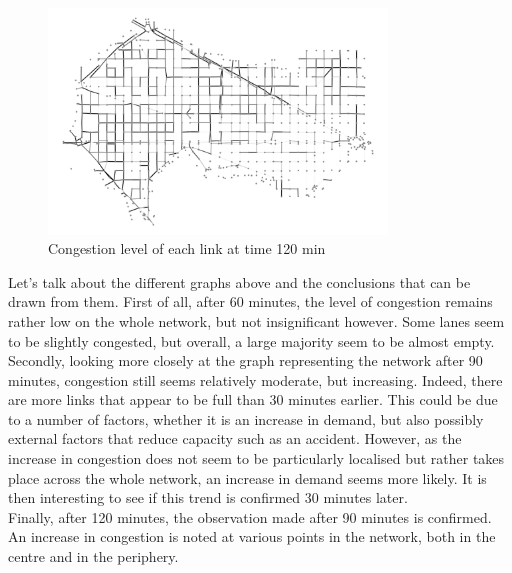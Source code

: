 \documentclass[a4paper, 12pt,oneside]{article}
\begin{document}
\begin{figure}[H]
    \begin{center}
        \includegraphics[width=9cm]{Images/Graph_gray_120min.png}
        \caption{Congestion level of each link at time 120 min}
        \label{Congestion level of each link at time 120 min}
    \end{center}
\end{figure}

\bigbreak
\newpage
Let's talk about the different graphs above and the conclusions that can be drawn from them. 
First of all, after 60 minutes, the level of congestion remains rather low on the whole network, but not insignificant however. Some lanes seem to be slightly congested, but overall, a large majority seem to be almost empty.\\
Secondly, looking more closely at the graph representing the network after 90 minutes, congestion still seems relatively moderate, but increasing. Indeed, there are more links that appear to be full than 30 minutes earlier. This could be due to a number of factors, whether it is an increase in demand, but also possibly external factors that reduce capacity such as an accident. However, as the increase in congestion does not seem to be particularly localised but rather takes place across the whole network, an increase in demand seems more likely. It is then interesting to see if this trend is confirmed 30 minutes later. \\
Finally, after 120 minutes, the observation made after 90 minutes is confirmed. An increase in congestion is noted at various points in the network, both in the centre and in the periphery.

\smallbreak
\end{document}
